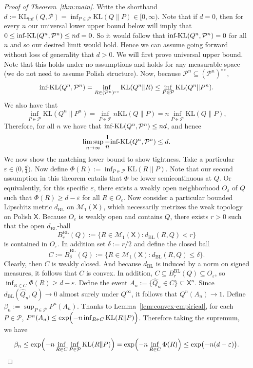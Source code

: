 \documentclass[11pt]{article}
\newcommand{\KL}{\mathrm{KL}}
\newcommand{\KLinf}{\mathrm{KL}_{\mathrm{inf}}}
\newcommand{\infKL}{\textnormal{inf-KL}}
\newcommand{\Pcal}{\mathcal{P}}
\newcommand{\X}{\mathsf{X}}
\theoremstyle{definition}
\theoremstyle{definition}
\begin{document}
\begin{proof}[Proof of Theorem~\ref{thm:main}]
Write the shorthand $d:=\KLinf(Q,\Pcal)=\inf_{P\in\Pcal}\KL(Q\|P)\in[0,\infty)$. Note that if $d=0$, then for every $n$ our universal lower upper bound below will imply that $0\le \infKL(Q^n, \Pcal^n)\le nd=0$. So it would follow that $\infKL(Q^n, \Pcal^n)=0$ for all $n$ and so our desired limit would hold. Hence we can assume going forward without loss of generality that $d>0$. We will first prove universal upper bound. Note that this holds under no assumptions and holds for any measurable space (we do not need to assume Polish structure). Now, because $\Pcal^n\subseteq (\Pcal^n)^{\circ\circ}$,
\[
\infKL(Q^n, \Pcal^n) = \inf_{R\in(\Pcal^n)^{\circ\circ}}\KL(Q^n\|R)\le \inf_{P\in\Pcal} \KL(Q^n\|P^n).
\]
We also have that
\[\inf_{P\in\Pcal}\KL(Q^n\|P^n)=\inf_{P\in\Pcal}n\KL(Q\|P)= n\inf_{P\in\Pcal}\KL(Q\|P),
\]
Therefore, for all $n$ we have that $\infKL(Q^n, \Pcal^n)\le nd$, and hence
\[
\limsup_{n\to\infty}\frac{1}{n}\infKL(Q^n, \Pcal^n)\le d.
\]
We now show the matching lower bound to show tightness. Take a particular $\varepsilon\in\bigl(0,\tfrac{d}{4}\bigr)$. Now define $\Phi(R):=\inf_{P\in\Pcal}\KL(R\|P)$. Note that our second assumption in this theorem entails that $\Phi$ be lower semicontinuous at $Q$. Or equivalently, for this specific $\varepsilon$, there exists a weakly open neighborhood $O_\varepsilon$ of $Q$ such that $\Phi(R)\ge d-\varepsilon$ for all $R\in O_\varepsilon$. Now consider a particular bounded Lipschitz metric $d_{\mathrm{BL}}$ on $\mathcal M_1(\X)$, which necessarily metrizes the weak topology on Polish $\X$. Because $O_\varepsilon$ is weakly open and contains $Q$, there exists $r>0$ such that the open $d_{\mathrm{BL}}$-ball
\[
B_r^{\mathrm{BL}}(Q):=\{R\in\mathcal M_1(\X):d_{\mathrm{BL}}(R,Q)<r\}
\]
is contained in $O_\varepsilon$. In addition set $\delta:=r/2$ and define the closed ball
\[
C:=\overline{B}_\delta^{\mathrm{BL}}(Q):=\{R\in\mathcal M_1(\X): d_{\mathrm{BL}}(R,Q)\le \delta\}.
\]
Clearly, then $C$ is weakly closed. And because $d_{\mathrm{BL}}$ is induced by a norm on signed measures, it follows that $C$ is convex. In addition, $C\subseteq B_r^{\mathrm{BL}}(Q)\subseteq O_\varepsilon$, so $\inf_{R\in C}\Phi(R)\ge d-\varepsilon$. Define the event $A_n:=\{\widehat Q_n\in C\}\subseteq \X^n$. Since $d_{\mathrm{BL}}(\widehat Q_n,Q)\to 0$ almost surely under $Q^\infty$, it follows that $Q^n(A_n)\to 1$. Define $\beta_n:=\sup_{P\in\Pcal}P^n(A_n)$. Thanks to Lemma~\ref{lem:convex-empirical}, for each $P\in\Pcal$, $P^n(A_n)\le \exp\Bigl(-n\inf_{R\in C}\KL(R\|P)\Bigr)$. Therefore taking the supremum, we have 
\[
\beta_n\le \exp\Bigl(-n\inf_{R\in C}\inf_{P\in\Pcal}\KL(R\|P)\Bigr) =\exp\Bigl(-n\inf_{R\in C}\Phi(R)\Bigr) \le \exp\bigl(-n(d-\varepsilon)\bigr).
\]


\end{proof}
\end{document}
